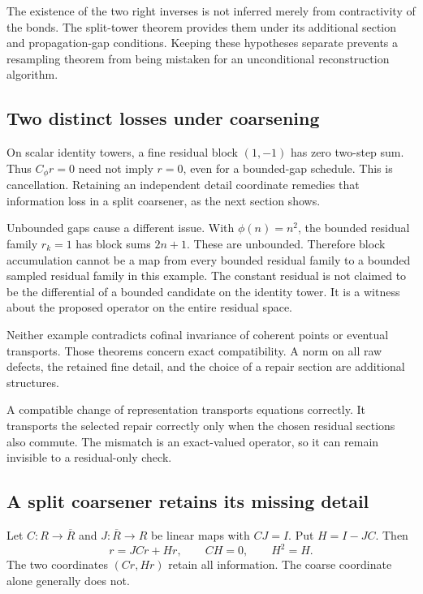 The existence of the two right inverses is not inferred merely from contractivity of the bonds. The split-tower theorem provides them under its additional section and propagation-gap conditions. Keeping these hypotheses separate prevents a resampling theorem from being mistaken for an unconditional reconstruction algorithm.

\subsection{Two distinct losses under coarsening}
On scalar identity towers, a fine residual block \((1,-1)\) has zero two-step sum. Thus \(C_\phi r=0\) need not imply \(r=0\), even for a bounded-gap schedule. This is cancellation. Retaining an independent detail coordinate remedies that information loss in a split coarsener, as the next section shows.

Unbounded gaps cause a different issue. With \(\phi(n)=n^2\), the bounded residual family \(r_k=1\) has block sums \(2n+1\). These are unbounded. Therefore block accumulation cannot be a map from every bounded residual family to a bounded sampled residual family in this example. The constant residual is not claimed to be the differential of a bounded candidate on the identity tower. It is a witness about the proposed operator on the entire residual space.

Neither example contradicts cofinal invariance of coherent points or eventual transports. Those theorems concern exact compatibility. A norm on all raw defects, the retained fine detail, and the choice of a repair section are additional structures.

\begin{insight}
A compatible change of representation transports equations correctly. It transports the selected repair correctly only when the chosen residual sections also commute. The mismatch is an exact-valued operator, so it can remain invisible to a residual-only check.
\end{insight}



\label{KS:sec:cascade}
\subsection{A split coarsener retains its missing detail}
Let \(C:R\to\overline R\) and \(J:\overline R\to R\) be linear maps with \(CJ=I\). Put \(H=I-JC\). Then
\[
 r=JCr+Hr,\qquad CH=0,\qquad H^2=H.
\]
The two coordinates \((Cr,Hr)\) retain all information. The coarse coordinate alone generally does not.

